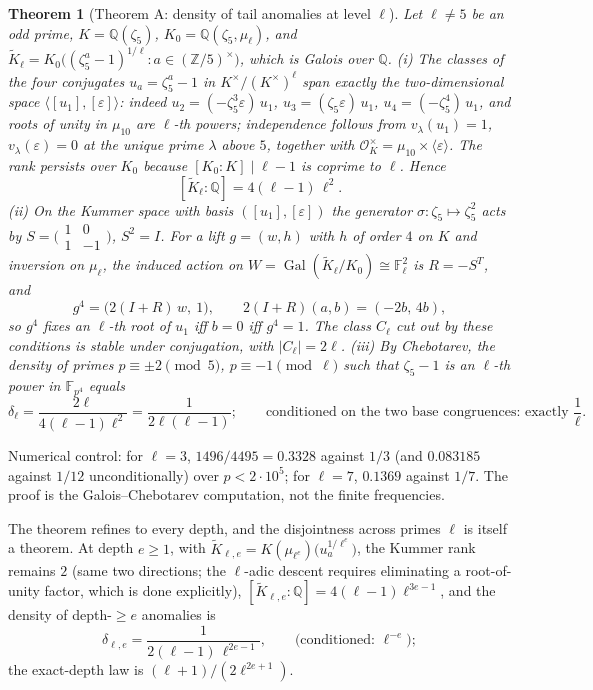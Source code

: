 \documentclass[11pt]{amsart}
\newtheorem{theorem}{Theorem}[section]
\theoremstyle{definition}
\theoremstyle{remark}
\newcommand{\F}{\mathbb{F}}
\newcommand{\Z}{\mathbb{Z}}
\newcommand{\Q}{\mathbb{Q}}
\newcommand{\eps}{\varepsilon}
\newcommand{\Gal}{\operatorname{Gal}}
\begin{document}
\begin{theorem}[Theorem A: density of tail anomalies at level
$\ell$]\label{thm:A}
Let $\ell \ne 5$ be an odd prime, $K = \Q(\zeta_5)$,
$K_0 = \Q(\zeta_5, \mu_\ell)$, and
$\widetilde K_\ell = K_0\big((\zeta_5^a - 1)^{1/\ell} : a \in
(\Z/5)^\times\big)$, which is Galois over $\Q$.
\emph{(i)} The classes of the four conjugates $u_a = \zeta_5^a - 1$ in
$K^\times/(K^\times)^\ell$ span exactly the two-dimensional space
$\langle [u_1], [\eps] \rangle$: indeed
$u_2 = (-\zeta_5^3\eps)\,u_1$, $u_3 = (\zeta_5\eps)\,u_1$,
$u_4 = (-\zeta_5^4)\,u_1$, and roots of unity in $\mu_{10}$ are
$\ell$-th powers; independence follows from $v_\lambda(u_1) = 1$,
$v_\lambda(\eps) = 0$ at the unique prime $\lambda$ above $5$, together
with $\mathcal O_K^\times = \mu_{10} \times \langle \eps \rangle$. The
rank persists over $K_0$ because $[K_0 : K] \mid \ell - 1$ is coprime to
$\ell$. Hence
\[
[\widetilde K_\ell : \Q] = 4(\ell-1)\,\ell^2.
\]
\emph{(ii)} On the Kummer space with basis $([u_1], [\eps])$ the
generator $\sigma : \zeta_5 \mapsto \zeta_5^2$ acts by
$S = \bigl(\begin{smallmatrix}1 & 0\\ 1 & -1\end{smallmatrix}\bigr)$,
$S^2 = I$. For a lift $g = (w, h)$ with $h$ of order $4$ on $K$ and
inversion on $\mu_\ell$, the induced action on
$W = \Gal(\widetilde K_\ell/K_0) \cong \F_\ell^2$ is $R = -S^{T}$, and
\[
g^4 = \big(2(I + R)\,w,\ 1\big), \qquad 2(I+R)(a,b) = (-2b,\, 4b),
\]
so \emph{$g^4$ fixes an $\ell$-th root of $u_1$ iff $b = 0$ iff
$g^4 = 1$}. The class $C_\ell$ cut out by these conditions is stable
under conjugation, with $|C_\ell| = 2\ell$.
\emph{(iii)} By Chebotarev, the density of primes
$p \equiv \pm2 \pmod 5$, $p \equiv -1 \pmod \ell$ such that
$\zeta_5 - 1$ is an $\ell$-th power in $\F_{p^4}$ equals
\[
\delta_\ell = \frac{2\ell}{4(\ell-1)\ell^2} =
\frac{1}{2\ell(\ell-1)};
\qquad
\text{conditioned on the two base congruences: exactly } \frac1\ell.
\]
\end{theorem}

Numerical control: for $\ell = 3$, $1496/4495 = 0.3328$ against $1/3$
(and $0.083185$ against $1/12$ unconditionally) over $p < 2\cdot10^5$;
for $\ell = 7$, $0.1369$ against $1/7$. The proof is the
Galois--Chebotarev computation, not the finite frequencies.

The theorem refines to every depth, and the disjointness across primes
$\ell$ is itself a theorem. At depth $e \ge 1$, with
$\widetilde K_{\ell,e} = K(\mu_{\ell^e})\big(u_a^{1/\ell^e}\big)$,
the Kummer rank remains $2$ (same two directions; the $\ell$-adic descent
requires eliminating a root-of-unity factor, which is done explicitly),
$[\widetilde K_{\ell,e} : \Q] = 4(\ell-1)\ell^{3e-1}$, and the density of
depth-$\ge e$ anomalies is
\[
\delta_{\ell,e} = \frac{1}{2(\ell-1)\,\ell^{2e-1}},
\qquad
\text{(conditioned: } \ell^{-e}\text{)};
\]
the exact-depth law is $(\ell+1)/(2\ell^{2e+1})$.
\end{document}
